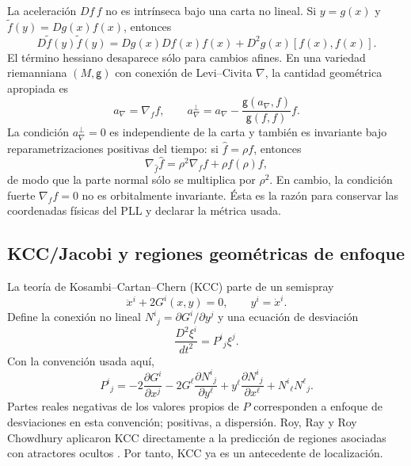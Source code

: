 La aceleración $Df\,f$ no es intrínseca bajo una carta no lineal. Si
$y=g(x)$ y $\widetilde f(y)=Dg(x)f(x)$, entonces
\begin{equation}
 D\widetilde f(y)\widetilde f(y)
 =Dg(x)Df(x)f(x)+D^2g(x)[f(x),f(x)].
 \label{gt:eq:nonlinear-coordinate-acceleration}
\end{equation}
El término hessiano desaparece sólo para cambios afines. En una variedad
riemanniana $(M,\mathsf g)$ con conexión de Levi--Civita $\nabla$, la cantidad
geométrica apropiada es
\begin{equation}
 a_\nabla=\nabla_f f,
 \qquad
 a_\nabla^\perp
 =a_\nabla-\frac{\mathsf g(a_\nabla,f)}{\mathsf g(f,f)}f.
 \label{gt:eq:covariant-normal-acceleration}
\end{equation}
La condición $a_\nabla^\perp=0$ es independiente de la carta y también es
invariante bajo reparametrizaciones positivas del tiempo: si
$\widehat f=\rho f$, entonces
\begin{equation}
 \nabla_{\widehat f}\widehat f
 =\rho^2\nabla_f f+\rho f(\rho)f,
 \label{gt:eq:time-rescaling-covariant}
\end{equation}
de modo que la parte normal sólo se multiplica por $\rho^2$. En cambio, la
condición fuerte $\nabla_f f=0$ no es orbitalmente invariante. Ésta es la razón
para conservar las coordenadas físicas del PLL y declarar la métrica usada.

\subsection{KCC/Jacobi y regiones geométricas de enfoque}
\label{subsec:gt-kcc}

La teoría de Kosambi--Cartan--Chern (KCC) parte de un semispray
\begin{equation}
 \ddot x^i+2G^i(x,y)=0,
 \qquad y^i=\dot x^i.
 \label{gt:eq:kcc-semispray}
\end{equation}
Define la conexión no lineal
$N^i{}_j=\partial G^i/\partial y^j$ y una ecuación de desviación
\begin{equation}
 \frac{D^2\xi^i}{dt^2}=P^i{}_j\xi^j.
 \label{gt:eq:kcc-deviation}
\end{equation}
Con la convención usada aquí,
\begin{equation}
 P^i{}_j=-2\frac{\partial G^i}{\partial x^j}
 -2G^\ell\frac{\partial N^i{}_j}{\partial y^\ell}
 +y^\ell\frac{\partial N^i{}_j}{\partial x^\ell}
 +N^i{}_\ell N^\ell{}_j.
 \label{gt:eq:kcc-P}
\end{equation}
Partes reales negativas de los valores propios de $P$ corresponden a enfoque
de desviaciones en esta convención; positivas, a dispersión. Roy, Ray y Roy
Chowdhury aplicaron KCC directamente a la predicción de regiones asociadas con
atractores ocultos \cite{RoyRayChowdhury2024KCC}. Por tanto, KCC ya es un
antecedente de localización.

